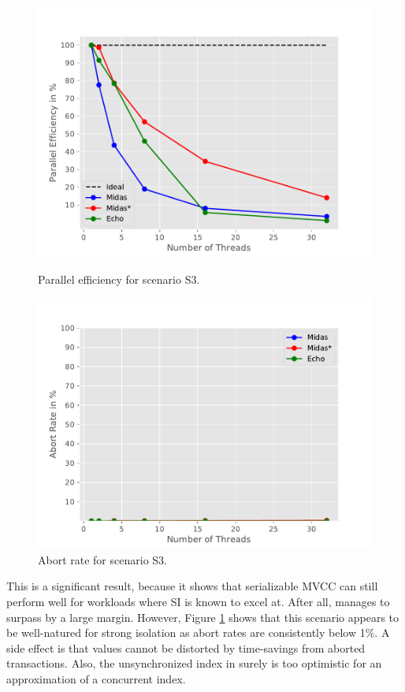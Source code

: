 \begin{figure}[h!]
\begin{minipage}[l]{0.50\textwidth}
    \includegraphics[width=\textwidth]{figures/bench/eff-ls}
    \caption{Parallel efficiency for scenario S3.}
    \label{fig:eff-s3}
\end{minipage}
\begin{minipage}[l]{0.50\textwidth}
    \includegraphics[width=\textwidth]{figures/bench/ar-ls}
    \caption{Abort rate for scenario S3.}
    \label{fig:ar-s3}
\end{minipage}
\end{figure}

This is a significant result, because it shows that serializable MVCC can still
perform well for workloads where SI is known to excel at. After all, \midasopt
manages to surpass \echo by a large margin. However, Figure \ref{fig:ar-s3}
shows that this scenario appears to be well-natured for strong isolation as
abort rates are consistently below 1\%. A side effect is that \ttp values cannot
be distorted by time-savings from aborted transactions. Also, the unsynchronized
index in \midasopt surely is too optimistic for an approximation of a concurrent
index.

